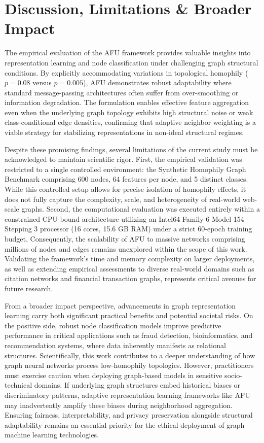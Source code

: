 \documentclass[10pt,twocolumn]{article}
\begin{document}
\section{Discussion, Limitations \& Broader Impact}
\label{sec:discussion}

The empirical evaluation of the \textsc{AFU} framework provides valuable insights into representation learning and node classification under challenging graph structural conditions. By explicitly accommodating variations in topological homophily ($p=0.08$ versus $p=0.005$), \textsc{AFU} demonstrates robust adaptability where standard message-passing architectures often suffer from over-smoothing or information degradation. The formulation enables effective feature aggregation even when the underlying graph topology exhibits high structural noise or weak class-conditional edge densities, confirming that adaptive neighbor weighting is a viable strategy for stabilizing representations in non-ideal structural regimes.

Despite these promising findings, several limitations of the current study must be acknowledged to maintain scientific rigor. First, the empirical validation was restricted to a single controlled environment: the Synthetic Homophily Graph Benchmark comprising 600 nodes, 64 features per node, and 5 distinct classes. While this controlled setup allows for precise isolation of homophily effects, it does not fully capture the complexity, scale, and heterogeneity of real-world web-scale graphs. Second, the computational evaluation was executed entirely within a constrained CPU-bound architecture utilizing an Intel64 Family 6 Model 154 Stepping 3 processor (16 cores, 15.6 GB RAM) under a strict 60-epoch training budget. Consequently, the scalability of \textsc{AFU} to massive networks comprising millions of nodes and edges remains unexplored within the scope of this work. Validating the framework's time and memory complexity on larger deployments, as well as extending empirical assessments to diverse real-world domains such as citation networks and financial transaction graphs, represents critical avenues for future research.

From a broader impact perspective, advancements in graph representation learning carry both significant practical benefits and potential societal risks. On the positive side, robust node classification models improve predictive performance in critical applications such as fraud detection, bioinformatics, and recommendation systems, where data inherently manifests as relational structures. Scientifically, this work contributes to a deeper understanding of how graph neural networks process low-homophily topologies. However, practitioners must exercise caution when deploying graph-based models in sensitive socio-technical domains. If underlying graph structures embed historical biases or discriminatory patterns, adaptive representation learning frameworks like \textsc{AFU} may inadvertently amplify these biases during neighborhood aggregation. Ensuring fairness, interpretability, and privacy preservation alongside structural adaptability remains an essential priority for the ethical deployment of graph machine learning technologies.
\end{document}
